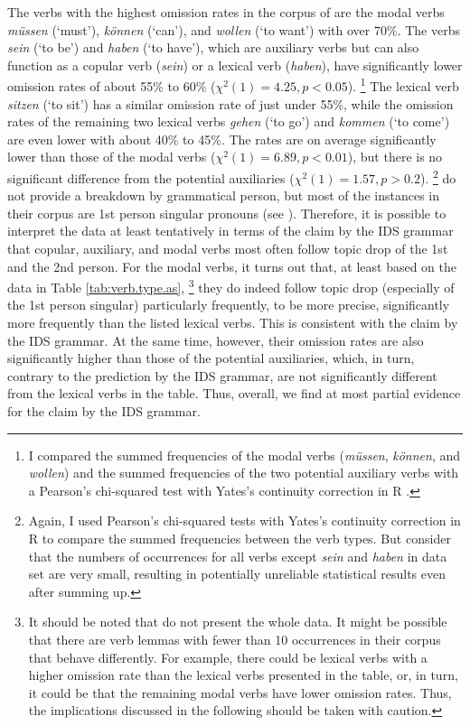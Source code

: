 The verbs with the highest omission rates in the corpus of \citet{androutsopoulos.schmidt2002} are the modal verbs \textit{müssen} (`must'), \textit{können} (`can'), and \textit{wollen} (`to want') with over 70\%.
The  verbs \textit{sein} (`to be') and \textit{haben} (`to have'), which are auxiliary verbs but can also function as a copular verb (\textit{sein}) or a lexical verb (\textit{haben}), have significantly lower omission rates of about 55\% to 60\% ($\chi^2(1) = 4.25, p < 0.05$).%
\footnote{I compared the summed frequencies of the modal verbs (\textit{müssen}, \textit{können}, and \textit{wollen}) and the summed frequencies of the two potential auxiliary verbs with a Pearson's chi-squared test with Yates's continuity correction in R \citep{rcoreteam2021}.}
%
The lexical verb \textit{sitzen} (`to sit') has a similar omission rate of just under 55\%, while the omission rates of the remaining two lexical verbs \textit{gehen} (`to go')  and \textit{kommen} (`to come') are even lower with about 40\% to 45\%.
The rates are on average significantly lower than those of the modal verbs ($\chi^2(1) = 6.89, p < 0.01$), but there is no significant difference from the potential auxiliaries ($\chi^2(1) = 1.57, p > 0.2$).%
\footnote{Again, I used Pearson's chi-squared tests with Yates's continuity correction in R \citep{rcoreteam2021} to compare the summed frequencies between the verb types.
But consider that the numbers of occurrences for all verbs except \textit{sein} and \textit{haben} in  data set are very small, resulting in potentially unreliable statistical results even after summing up.}
%
\citet{androutsopoulos.schmidt2002} do not provide a breakdown by grammatical person, but most of the instances in their corpus are 1st person singular pronouns (see ).
Therefore, it is possible to interpret the data at least tentatively in terms of the claim by the IDS grammar \citep{zifonun.etal1997} that copular, auxiliary, and modal verbs most often follow topic drop of the 1st and the 2nd person.
For the modal verbs, it turns out that, at least based on the data in Table \ref{tab:verb.type.as},%
\footnote{It should be noted that \citet{androutsopoulos.schmidt2002} do not present the whole data.
It might be possible that there are verb lemmas with fewer than 10 occurrences in their corpus that behave differently.
For example, there could be lexical verbs with a higher omission rate than the lexical verbs presented in the table, or, in turn, it could be that the remaining modal verbs have lower omission rates.
Thus, the implications discussed in the following should be taken with caution.}
%
they do indeed follow topic drop (especially of the 1st person singular) particularly frequently, to be more precise, significantly more frequently than the listed lexical verbs.
This is consistent with the claim by the IDS grammar.
At the same time, however, their omission rates are also significantly higher than those of the potential auxiliaries, which, in turn, contrary to the prediction by the IDS grammar, are not significantly different from the lexical verbs in the table.
Thus, overall, we find at most partial evidence for the claim by the IDS grammar.

